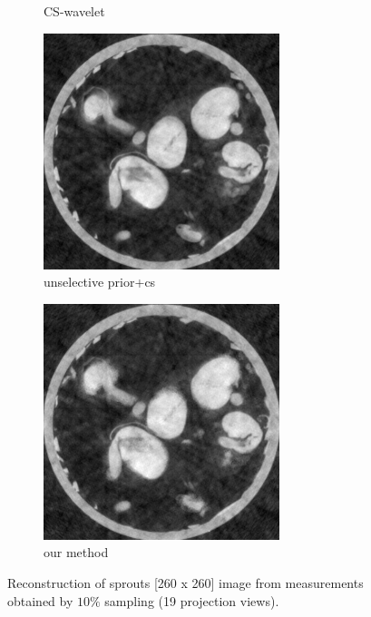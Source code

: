 \documentclass{article}
\begin{document}
\begin{figure}[h]
\begin{subfigure}[b]{0.3\linewidth}
        \caption{CS-wavelet}
     \end{subfigure}
\quad
    \begin{subfigure}[b]{0.3\linewidth}
        \includegraphics[width=\textwidth]{../images/supplementary/2D_sprouts/19_angles/1/plain_pca.png}
        \caption{unselective prior+cs}
     \end{subfigure}
\quad
    \begin{subfigure}[b]{0.3\linewidth}
        \includegraphics[width=\textwidth]{../images/supplementary/2D_sprouts/19_angles/1/weighted_pca5.png}
       \caption{our method}
     \end{subfigure}
      \caption{Reconstruction of sprouts [260 x 260] image from measurements obtained by $10\%$ sampling (19 projection views).}
\label{fig:joint}
\end{figure}
\end{document}
